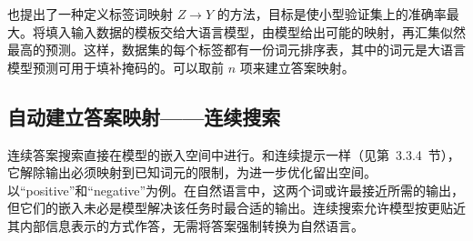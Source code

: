 也提出了一种定义标签词映射 $Z\to Y$ 的方法，目标是使小型验证集上的准确率最大。将填入输入数据的模板交给大语言模型，由模型给出可能的映射，再汇集似然最高的预测。这样，数据集的每个标签都有一份词元排序表，其中的词元是大语言模型预测可用于填补掩码的。可以取前 $n$ 项来建立答案映射。

\subsection{自动建立答案映射——连续搜索}
连续答案搜索直接在模型的嵌入空间中进行。和连续提示一样（见第~3.3.4~节），它解除输出必须映射到已知词元的限制，为进一步优化留出空间。以“positive”和“negative”为例。在自然语言中，这两个词或许最接近所需的输出，但它们的嵌入未必是模型解决该任务时最合适的输出。连续搜索允许模型按更贴近其内部信息表示的方式作答，无需将答案强制转换为自然语言。

